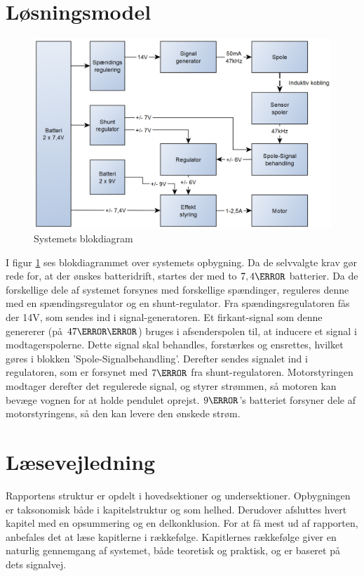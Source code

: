 \section{Løsningsmodel}
\begin{figure}[h!]
	\centering
	\includegraphics[width=.9\textwidth]{diagram/blokdiagram1.png}
	\caption{Systemets blokdiagram}
	\label{fig:blockdiagram1}
\end{figure}
\FloatBlock
I figur \ref{fig:blockdiagram1} ses blokdiagrammet over systemets opbygning. 
Da de selvvalgte krav gør rede for, at der ønskes batteridrift, startes der med to $7,4\volt$ batterier. 
Da de forskellige dele af systemet forsynes med forskellige spændinger, reguleres denne med en spændingsregulator og en shunt-regulator. Fra spændingsregulatoren fås der 14V, som sendes ind i signal-generatoren. 
Et firkant-signal som denne genererer (på $47\kilo\hertz$) bruges i afsenderspolen til, at inducere et signal i modtagerspolerne. 
Dette signal skal behandles, forstærkes og ensrettes, hvilket gøres i blokken 'Spole-Signalbehandling'.
Derefter sendes signalet ind i regulatoren, som er forsynet med $7\volt$ fra shunt-regulatoren. 
Motorstyringen modtager derefter det regulerede signal, og styrer strømmen, så motoren kan bevæge vognen for at holde pendulet oprejst. 
$9\volt$'s batteriet forsyner dele af motorstyringens, så den kan levere den ønskede strøm. 

\section{Læsevejledning}
Rapportens struktur er opdelt i hovedsektioner og undersektioner.
Opbygningen er taksonomisk både i kapitelstruktur og som helhed. 
Derudover afsluttes hvert kapitel med en opsummering og en delkonklusion.
For at få mest ud af rapporten, anbefales det at læse kapitlerne i rækkefølge.
Kapitlernes rækkefølge giver en naturlig gennemgang af systemet, både teoretisk og praktisk, og er baseret på dets signalvej.

